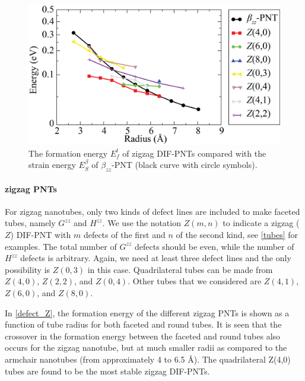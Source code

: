 \begin{figure}[htb]
\centering
\includegraphics[width=0.9\linewidth]{Nanotu_ZE.eps}%
\caption{The formation energy $E_f^t$ of zigzag DIF-PNTs compared with the strain energy $E_S^{\beta}$ of $\beta_{zz}$-PNT (black curve with circle symbols). \label{defect_Z}}
\end{figure}

\paragraph*{zigzag PNTs}
For zigzag nanotubes, only two kinds of defect lines are included to make faceted tubes, namely $G^{zz}$ and $H^{zz}$. We use the notation  $Z(m,n)$ to indicate a zigzag ($Z$) DIF-PNT with $m$ defects of the first and $n$ of the second kind, see \autoref{tubes} for examples. The total number of $G^{zz}$ defects should be even, while the number of $H^{zz}$ defects is arbitrary. Again, we need at least three defect lines and the only possibility is $Z(0,3)$ in this case. Quadrilateral tubes can be made from $Z(4,0)$, $Z(2,2)$, and $Z(0,4)$. Other tubes that we considered are $Z(4,1)$, $Z(6,0)$, and $Z(8,0)$. 

In \autoref{defect_Z}, the formation energy of the different zigzag PNTs is shown as a function of tube radius for both faceted and round tubes. It is seen that the crossover in the formation energy between the faceted and round tubes also occurs for the zigzag nanotube, but at much smaller radii as compared to the armchair nanotubes (from approximately 4 to 6.5 {\AA}). The quadrilateral Z(4,0) tubes are found to be the most stable zigzag DIF-PNTs. 

